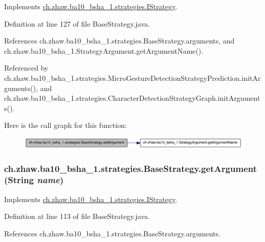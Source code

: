 Implements \hyperlink{interfacech_1_1zhaw_1_1ba10__bsha__1_1_1strategies_1_1IStrategy_a503733cf208ec99900463a36b2fea6b2}{ch.zhaw.ba10\_\-bsha\_\-1.strategies.IStrategy}.

Definition at line 127 of file BaseStrategy.java.

References ch.zhaw.ba10\_\-bsha\_\-1.strategies.BaseStrategy.arguments, and ch.zhaw.ba10\_\-bsha\_\-1.StrategyArgument.getArgumentName().

Referenced by ch.zhaw.ba10\_\-bsha\_\-1.strategies.MicroGestureDetectionStrategyPrediction.initArguments(), and ch.zhaw.ba10\_\-bsha\_\-1.strategies.CharacterDetectionStrategyGraph.initArguments().

Here is the call graph for this function:\nopagebreak
\begin{figure}[H]
\begin{center}
\leavevmode
\includegraphics[width=321pt]{classch_1_1zhaw_1_1ba10__bsha__1_1_1strategies_1_1BaseStrategy_ad106d9d501550fe475a4a01032632597_cgraph}
\end{center}
\end{figure}
\hypertarget{classch_1_1zhaw_1_1ba10__bsha__1_1_1strategies_1_1BaseStrategy_a8c113a7ead0de41b8dbd5e58d66de08e}{
\subsubsection[{getArgument}]{ ch.zhaw.ba10\_\-bsha\_\-1.strategies.BaseStrategy.getArgument (String {\em name})}}
\label{classch_1_1zhaw_1_1ba10__bsha__1_1_1strategies_1_1BaseStrategy_a8c113a7ead0de41b8dbd5e58d66de08e}


Implements \hyperlink{interfacech_1_1zhaw_1_1ba10__bsha__1_1_1strategies_1_1IStrategy_acc7ef9593926bb88c142d296332525cc}{ch.zhaw.ba10\_\-bsha\_\-1.strategies.IStrategy}.

Definition at line 113 of file BaseStrategy.java.

References ch.zhaw.ba10\_\-bsha\_\-1.strategies.BaseStrategy.arguments.

